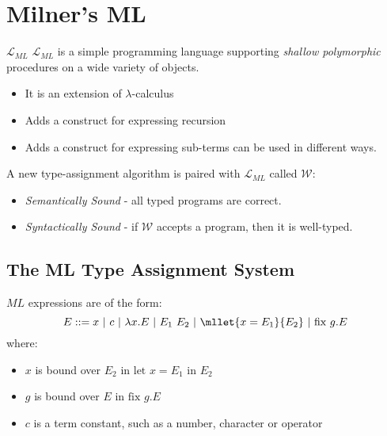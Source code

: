 
\chapter{Milner's ML}
\begin{definitionbox}{$\mathcal{L}_{ML}$}
	$\mathcal{L}_{ML}$ is a simple programming language supporting \textit{shallow polymorphic} procedures on a wide variety of objects.
	\begin{itemize}
		\item It is an extension of $\lambda$-calculus
		\item Adds a construct for expressing recursion
		\item Adds a construct for expressing sub-terms can be used in different ways.
	\end{itemize}
\end{definitionbox}

A new type-assignment algorithm is paired with $\mathcal{L}_{ML}$ called $\mathcal{W}$:
\begin{itemize}
	\item \textit{Semantically Sound} - all typed programs are correct.
	\item \textit{Syntactically Sound} - if $\mathcal{W}$ accepts a program, then it is well-typed.
\end{itemize}

\section{The ML Type Assignment System}
$ML$ expressions are of the form:
\[E ::= x \ | \ c \ | \ \lambda x.E \ | \ E_1 \ E_2 \ | \ \mllet{x = E_1}{E_2} \ | \ \text{fix }g . E\]
where:
\begin{itemize}
	\item $x$ is bound over $E_2$ in $\text{let }x = E_1 \text{ in } E_2$
	\item $g$ is bound over $E$ in $\text{fix }g . E$
	\item $c$ is a term constant, such as a number, character or operator
\end{itemize}
